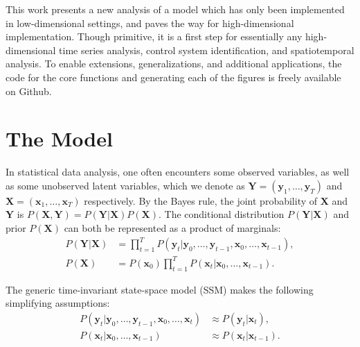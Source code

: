 \documentclass[fleqn,12pt]{article}
\providecommand{\mb}[1]{\boldsymbol{#1}}
\newcommand{\bx}{\mb{x}}
\newcommand{\by}{\mb{y}}
\newcommand{\bX}{\mb{X}}
\newcommand{\bY}{\mb{Y}}
\begin{document}
This work presents a new analysis of a model which has only been implemented in low-dimensional settings,
and paves the way for high-dimensional implementation. Though primitive, it is a first step for essentially any high-dimensional time series analysis, control system identification, and spatiotemporal analysis. To enable extensions, generalizations, and additional applications, the code for the core functions and generating each of the figures is freely available on Github. %
%
%
%



\section{The Model}

In statistical data analysis, one often encounters some observed variables, as well as some unobserved latent variables, which we denote as $\bY=(\by_1,\ldots,\by_T)$ and $\bX=(\bx_1,\ldots,\bx_T)$ respectively. By the Bayes rule, the joint probability of $\bX$ and $\bY$ is $P(\bX,\bY)=P(\bY|\bX) P(\bX)$. The conditional distribution $P(\mb{Y}|\mb{X})$ and prior $P(\mb{X})$ can both be represented as a product of marginals:
%
%
%
%
%
\begin{equation*}
\begin{aligned}
P(\mb{Y}|\mb{X}) &= \prod_{t=1}^T P(\by_t | \by_0,\ldots,\by_{t-1}, \bx_0,\ldots,\bx_{t-1}), \\
P(\bX) &= P(\bx_0) \prod_{t=1}^T P(\bx_t | \bx_0,\ldots,\bx_{t-1}).
\end{aligned}
\end{equation*}

The generic time-invariant state-space model (SSM) makes the following simplifying assumptions:
\begin{equation}
\label{eq:genericssm}
\begin{aligned}
P(\by_t | \by_0,\ldots,\by_{t-1}, \bx_0,\ldots,\bx_t)  &\approx P(\by_t | \bx_t), \\
P(\bx_t | \bx_0,\ldots,\bx_{t-1}) &\approx P(\bx_t | \bx_{t-1}).
\end{aligned}
\end{equation}
\end{document}
